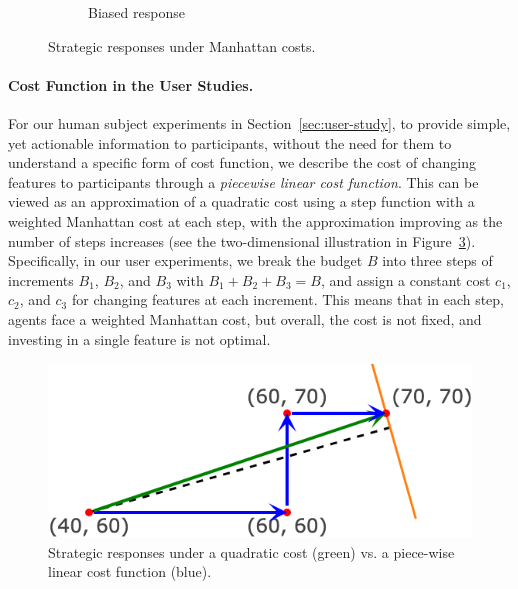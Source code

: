 \begin{figure}[ht]
\begin{subfigure}[t]{0.22\textwidth}
        \caption{Biased response}
        \label{fig:B-arrows-lin-cost}
    \end{subfigure}
    \caption{Strategic responses under Manhattan costs.}
    \label{fig:BR-illustration-lin-cost}
\end{figure}  

\paragraph{Cost Function in the User Studies.} For our human subject experiments in Section~\ref{sec:user-study}, to provide simple, yet actionable information to  participants, without the need for them to understand a specific form of cost function, we describe the cost of changing features to participants through a \emph{piecewise linear cost function}. This can be viewed as an approximation of a quadratic cost using a step function with a weighted Manhattan cost at each step, with the approximation improving as the number of steps increases (see the two-dimensional illustration in Figure~\ref{fig:2d-approx-illustration}). Specifically, in our user experiments, we break the budget $B$ into three steps of increments $B_1$, $B_2$, and $B_3$ with $B_1+B_2+B_3=B$, and assign a constant cost $c_1$, $c_2$, and $c_3$ for changing features at each increment. This means that in each step, agents face a weighted Manhattan cost, but overall, the cost is not fixed, and investing in a single feature is not optimal. 

\begin{figure}[ht]
    \centering
    \includegraphics[width=0.8\linewidth]{Figures/illustration-single-movement.png}
    \caption{Strategic responses under a quadratic cost (green) vs. a piece-wise linear cost function (blue).}
    \label{fig:2d-approx-illustration}
\end{figure}

